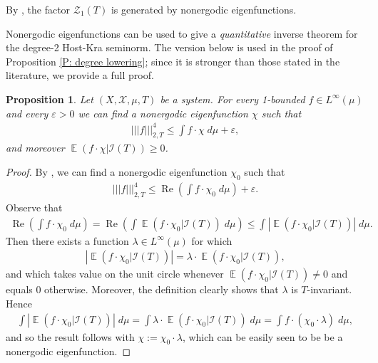 \documentclass[11pt]{amsart}
\newtheorem{proposition}[lemma]{Proposition}
\theoremstyle{definition}
\DeclareMathOperator*{\E}{\mathbb{E}}
\newcommand{\CI}{{\mathcal I}}
\newcommand{\CX}{{\mathcal X}}
\newcommand{\CZ}{{\mathcal Z}}
\newcommand{\veps}{\varepsilon}
\newcommand{\nnorm}[1]{\lvert\!|\!| #1|\!|\!\rvert}
\newcommand{\1}{{\mathbf{1}}}
\DeclareMathOperator{\reel}{Re}
\renewcommand{\Re}{\reel}
\newcommand{\abs}[1]{\mathopen{}\left| #1\mathclose{}\right|}
\newcommand{\brac}[1]{\mathopen{}\left( #1 \mathclose{}\right)}
\begin{document}
          By \cite[Theorem 5.2]{FH18}, the factor $\CZ_1(T)$ is generated by nonergodic eigenfunctions.

Nonergodic eigenfunctions can be used to give a \emph{quantitative} inverse theorem for the degree-2 Host-Kra seminorm. The version below is used in the proof of Proposition \ref{P: degree lowering}; since it is stronger than those stated in the literature, we provide a full proof. 
\begin{proposition}
    Let $(X, \CX, \mu, T)$ be a system. For every 1-bounded $f\in L^\infty(\mu)$ and every $\veps>0$ we can find a nonergodic eigenfunction $\chi$ such that 
    \begin{align*}
        \nnorm{f}_{2,T}^4 \leq \int f\cdot \chi\; d\mu + \veps,
    \end{align*}
    and moreover $\E(f\cdot \chi|\CI(T))\geq 0$.
\end{proposition}
\begin{proof}
    By \cite[Proposition 4.3]{FrKu22a}, we can find a nonergodic eigenfunction $\chi_0$ such that
    \begin{align*}
        \nnorm{f}_{2,T}^4 \leq \Re\brac{\int f\cdot \chi_0\; d\mu} + \veps.
    \end{align*}
    Observe that
    \begin{align*}
        \Re\brac{\int f\cdot \chi_0\; d\mu} = \Re\brac{\int \E(f\cdot \chi_0|\CI(T))\; d\mu}\leq \int \abs{\E(f\cdot \chi_0|\CI(T))}\; d\mu.
    \end{align*}
    Then there exists a function $\lambda\in L^\infty(\mu)$ for which 
    \begin{align*}
        \abs{\E(f\cdot \chi_0|\CI(T))} = \lambda\cdot \E(f\cdot \chi_0|\CI(T)),
    \end{align*}
    and which takes value on the unit circle whenever $\E(f\cdot \chi_0|\CI(T)) \neq 0$ and equals 0 otherwise. Moreover, the definition clearly shows that $\lambda$ is $T$-invariant. Hence
    \begin{align*}
        \int \abs{\E(f\cdot \chi_0|\CI(T))}\; d\mu = \int \lambda\cdot\E(f\cdot \chi_0|\CI(T))\; d\mu = \int f\cdot (\chi_0\cdot \lambda)\; d\mu,
    \end{align*}
    and so the result follows with $\chi := \chi_0\cdot \lambda$, which can be easily seen to be be a nonergodic eigenfunction.
\end{proof}
\end{document}
